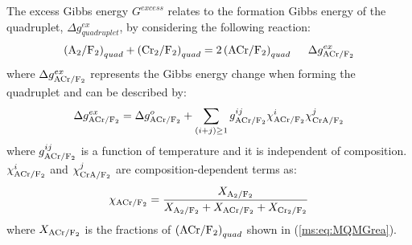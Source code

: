 The excess Gibbs energy $G^{excess}$ relates to the formation Gibbs energy of the quadruplet, $\Delta g_{quadruplet}^{ex}$, by considering the following reaction:
\begin{equation} \label{ms:eq:MQMGrea}
    \left(\rm {A_2/F_2}\right)_{quad}+\left({\rm Cr_2/F_2}\right)_{quad}=2\left({\rm ACr/F_2}\right)_{quad}\;\;\;\;\;\Delta g_{\rm ACr/F_2}^{ex}
\end{equation}
where $\Delta g_{\rm ACr/F_2}^{ex}$ represents the Gibbs energy change when forming the quadruplet and can be described by:
\begin{equation} \label{ms:eq:MQMGex}
    \Delta g_{\rm {ACr/F_2}}^{ex}=\Delta g_{\rm {ACr/F_2}}^o+\sum_{(i+j)\geq1} g_{\rm {ACr/F_2}}^{ij}\chi _{\rm {ACr/F_2}}^{i}\chi _{\rm {CrA/F_2}}^{j}
\end{equation}
where $g_{\rm {ACr/F_2}}^{ij}$ is a function of temperature and it is independent of composition. $\chi _{\rm {ACr/F_2}}^{i}$ and $\chi _{\rm {CrA/F_2}}^{j}$ are composition-dependent terms as:
\begin{equation} \label{ms:eq:chi}
    \chi_{\rm {ACr/F_2}} = \dfrac{X_{\rm {A_2/F_2}}}{X_{\rm {A_2/F_2}}+X_{\rm {ACr/F_2}}+X_{\rm {Cr_2/F_2}}}
\end{equation}
where $X_{\rm{ACr/F_2}}$ is the fractions of $\left(\rm{ACr/F_2}\right)_{quad}$ shown in (\ref{ms:eq:MQMGrea}). 


